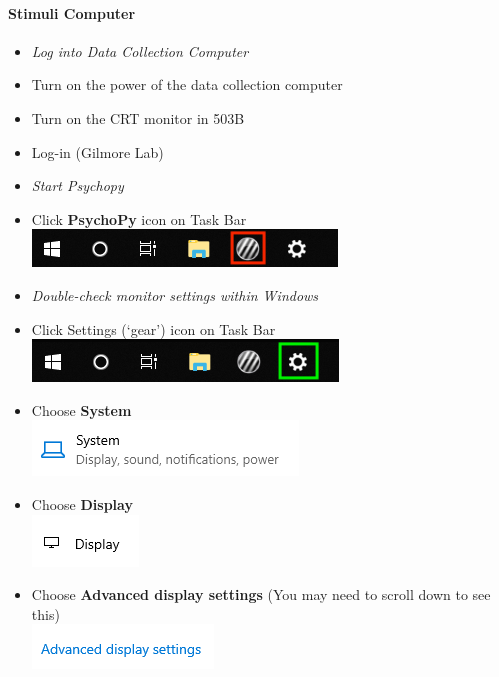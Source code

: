 \documentclass[]{article}
\let\oldparagraph\paragraph
\renewcommand{\paragraph}[1]{\oldparagraph{#1}\mbox{}}
\begin{document}
\paragraph{Stimuli Computer}\label{stimuli-computer}

\begin{itemize}
\item
  \emph{Log into Data Collection Computer}
\item
  Turn on the power of the data collection computer
\item
  Turn on the CRT monitor in 503B
\item
  Log-in (Gilmore Lab)
\item
  \emph{Start Psychopy}
\item
  Click \textbf{PsychoPy} icon on Task Bar
  \includegraphics{images/PsychoPy-1.PNG}\\
\item
  \emph{Double-check monitor settings within Windows}
\item
  Click Settings (`gear') icon on Task Bar
  \includegraphics{images/DispSettings-1.PNG}\\
\item
  Choose \textbf{System}\\
  \includegraphics{images/DS2.PNG}\\
\item
  Choose \textbf{Display}\\
  \includegraphics{images/ds3.PNG}\\
\item
  Choose \textbf{Advanced display settings} (You may need to scroll down
  to see this)\\
  \includegraphics{images/DS4.PNG}\\

\end{itemize}
\end{document}
